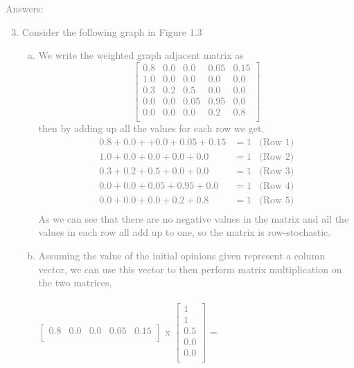 \documentclass[11pt]{article}
\begin{document}
\textcolor{gray}{
Answers:
\begin{enumerate}
	\setcounter{enumi}{2}
	\item Consider the following graph in Figure 1.3
	\begin{enumerate}[(a)]
		\item We write the weighted graph adjacent matrix as
		$$\begin{bmatrix} 
			0.8  & 0.0  & 0.0  & 0.05 & 0.15 \\
			1.0  & 0.0  & 0.0  & 0.0   & 0.0 \\
			0.3  & 0.2  & 0.5  & 0.0   & 0.0 \\
			0.0  & 0.0  & 0.05 & 0.95 & 0.0 \\
			0.0  & 0.0  & 0.0  & 0.2  & 0.8 \\
		\end{bmatrix}$$
then by adding up all the values for each row we get,
		\begin{align*}
			0.8 + 0.0 + + 0.0 + 0.05 + 0.15  	&= 1		&\text{(Row 1)}\\
			1.0 + 0.0 + 0.0 + 0.0 + 0.0 		&= 1		&\text{(Row 2)}\\
			0.3 + 0.2 + 0.5 + 0.0 + 0.0  		&= 1		&\text{(Row 3)}\\
			0.0 + 0.0 + 0.05 + 0.95 + 0.0		&= 1		&\text{(Row 4)}\\
			0.0 + 0.0 + 0.0 + 0.2 + 0.8		&= 1		&\text{(Row 5)}\\
		\end{align*} 
As we can see that there are no negative values in the matrix and all the values in each row all add up to one, so the matrix is row-stochastic. 
		\item 	Assuming the value of the initial opinions given represent a column vector, we can use this vector to then perform matrix multiplication on the two matrices,  \\ \\
		$\begin{bmatrix} 
			0.8  & 0.0  & 0.0  & 0.05 & 0.15 \\
		\end{bmatrix}$ 
		x
		$\begin{bmatrix} 
			1  \\  1  \\ 0.5  \\ 0.0 \\ 0.0 \\
		\end{bmatrix}$
		=

\end{enumerate}
\end{enumerate}}
\end{document}
